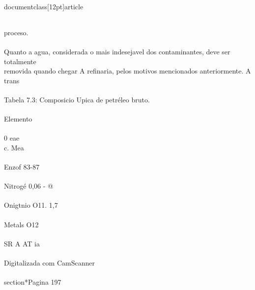 \\documentclass[12pt]{article}
\begin{document}
{\\
proceso.\\
\\
Quanto a agua, considerada o mais indesejavel dos contaminantes, deve ser totalmente\\
removida quando chegar A refinaria, pelos motivos mencionados anteriormente. A trans\\
\\
Tabela 7.3: Composicio Upica de petréleo bruto.\\
\\
Elemento\\
\\
0 eae\\
c. Mea\\
\\
Enzof 83-87\\
\\
Nitrogé 0,06 - @\\
\\
Onigtnio O11. 1,7\\
\\
Metals O12\\
\\
SR A AT ia\\
\\
Digitalizada com CamScanner\\

\\section*{Pagina 197}

}
\end{document}
